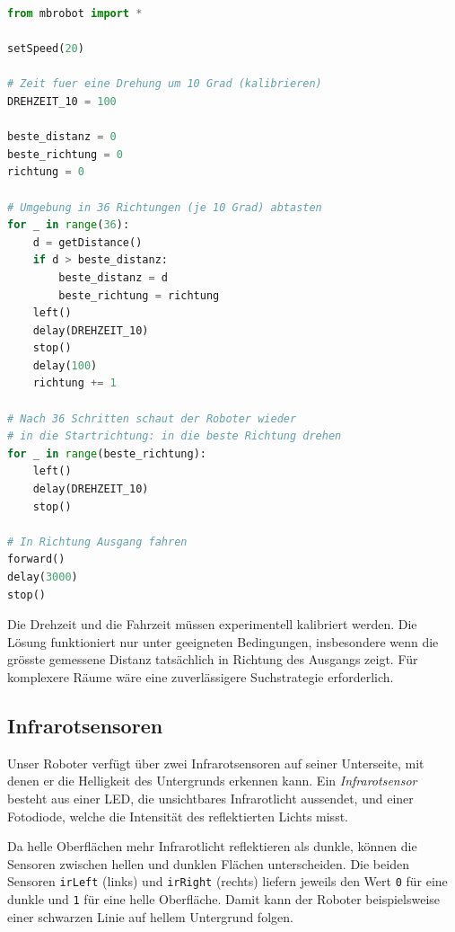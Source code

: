 \begin{myexercise}
\begin{myanswer}
        \begin{lstlisting}[language=Python]
from mbrobot import *

setSpeed(20)

# Zeit fuer eine Drehung um 10 Grad (kalibrieren)
DREHZEIT_10 = 100

beste_distanz = 0
beste_richtung = 0
richtung = 0

# Umgebung in 36 Richtungen (je 10 Grad) abtasten
for _ in range(36):
    d = getDistance()
    if d > beste_distanz:
        beste_distanz = d
        beste_richtung = richtung
    left()
    delay(DREHZEIT_10)
    stop()
    delay(100)
    richtung += 1

# Nach 36 Schritten schaut der Roboter wieder
# in die Startrichtung: in die beste Richtung drehen
for _ in range(beste_richtung):
    left()
    delay(DREHZEIT_10)
    stop()

# In Richtung Ausgang fahren
forward()
delay(3000)
stop()
        \end{lstlisting}

        Die Drehzeit und die Fahrzeit müssen
        experimentell kalibriert werden. Die Lösung
        funktioniert nur unter geeigneten Bedingungen,
        insbesondere wenn die grösste gemessene Distanz
        tatsächlich in Richtung des Ausgangs zeigt.
        Für komplexere Räume wäre eine zuverlässigere
        Suchstrategie erforderlich.
    \end{myanswer}
\end{myexercise}


\subsection*{Infrarotsensoren}

Unser Roboter verfügt über zwei Infrarotsensoren auf seiner
Unterseite, mit denen er die Helligkeit des Untergrunds
erkennen kann. Ein \emph{Infrarotsensor} besteht aus einer
LED, die unsichtbares Infrarotlicht aussendet, und einer
Fotodiode, welche die Intensität des reflektierten Lichts misst.

Da helle Oberflächen mehr Infrarotlicht reflektieren als
dunkle, können die Sensoren zwischen hellen und dunklen
Flächen unterscheiden. Die beiden Sensoren
\texttt{irLeft} (links) und \texttt{irRight} (rechts)
liefern jeweils den Wert \texttt{0} für eine dunkle
und \texttt{1} für eine helle Oberfläche.
Damit kann der Roboter beispielsweise einer schwarzen
Linie auf hellem Untergrund folgen.


